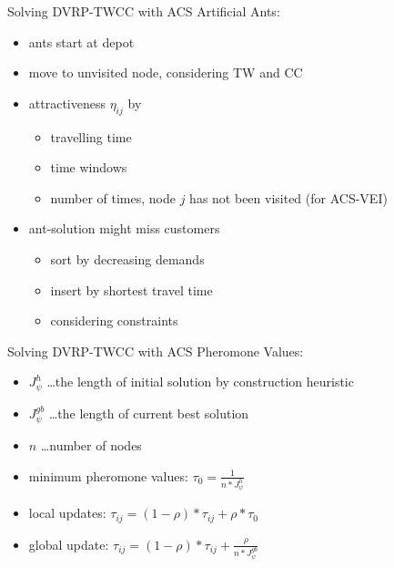 \documentclass{beamer}
\begin{document}
\begin{frame}{Solving DVRP-TWCC with ACS}
  Artificial Ants:
  \begin{itemize}
    \item ants start at depot
    \item move to unvisited node, considering TW and CC
    \item attractiveness $\eta_{ij}$ by
      \begin{itemize}
        \item travelling time
	\item time windows
	\item number of times, node $j$ has not been visited (for ACS-VEI)
      \end{itemize}
    \item ant-solution might miss customers
      \begin{itemize}
        \item sort by decreasing demands
	\item insert by shortest travel time
	\item considering constraints
      \end{itemize}
  \end{itemize}
\end{frame}

\begin{frame}{Solving DVRP-TWCC with ACS}
  Pheromone Values:
  \begin{itemize}
    \item $J^h_{\psi}$ \dots the length of initial solution by construction heuristic
    \item $J^{gb}_{\psi}$ \dots the length of current best solution
    \item $n$ \dots number of nodes
    \item minimum pheromone values: $\tau_0 = \frac{1}{n*J^h_{\psi}}$
    \item local updates: $\tau_{ij} = (1-\rho)*\tau_{ij} + \rho*\tau_0$\\
    \item global update: $\tau_{ij} = (1-\rho)*\tau_{ij} + \frac{\rho}{n*J^{gb}_{\psi}}$\\	  
  \end{itemize}
\end{frame}
\end{document}
